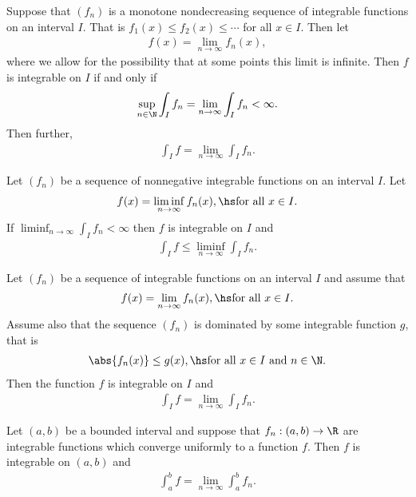 \documentclass{article}
\begin{document}
\begin{theorem}
    Suppose that $(f_n)$ is a monotone nondecreasing sequence of integrable functions on an interval $I$. That is 
    $f_1(x) \leq f_2(x) \leq \cdots$ for all $x\in I$. Then let 
    \begin{align*}
        f(x) = \lim_{n\to\infty}f_n(x),
    \end{align*} 
    where we allow for the possibility that at some points this limit is infinite. Then $f$ is integrable on $I$
    if and only if 
    \begin{align*}
        \sup_{n\in\N}\int_I f_n = \lim_{n\to\infty}\int_I f_n < \infty.
    \end{align*}
    Then further, 
    \begin{align*}
        \int_I f = \lim_{n\to\infty} \int_I f_n.
    \end{align*}
\end{theorem}

\begin{lemma}
    Let $(f_n)$ be a sequence of nonnegative integrable functions on an interval $I$. Let 
    \begin{align*}
        f(x) = \liminf_{n\to\infty} f_n(x), \hs\text{for all $x\in I$}.
    \end{align*}
    If $\liminf_{n\to\infty}\int_I f_n<\infty$ then $f$ is integrable on $I$ and 
    \begin{align*}
        \int_I f \leq \liminf_{n\to\infty} \int_I f_n.
    \end{align*}
\end{lemma}

\begin{theorem}
    Let $(f_n)$ be a sequence of integrable functions on an interval $I$ and assume that 
    \begin{align*}
        f(x) = \lim_{n\to\infty} f_n(x), \hs \text{for all $x\in I$}.
    \end{align*} 
    Assume also that the sequence $(f_n)$ is dominated by some integrable function $g$, that is 
    \begin{align*}
        \abs{f_n(x)} \leq g(x), \hs \text{for all $x\in I$ and $n\in\N$.}
    \end{align*}
    Then the function $f$ is integrable on $I$ and 
    \begin{align*}
        \int_I f = \lim_{n\to\infty} \int_I f_n.
    \end{align*}
\end{theorem}

\begin{theorem}[Notes 4.13]
    Let $(a,b)$ be a bounded interval and suppose that $f_n:(a,b)\to\R$ are integrable functions 
    which converge uniformly to a function $f$. Then $f$ is integrable on $(a,b)$ and 
    \begin{align*}
        \int_a^b f = \lim_{n\to\infty} \int_a^b f_n.
    \end{align*}
\end{theorem}
\end{document}
